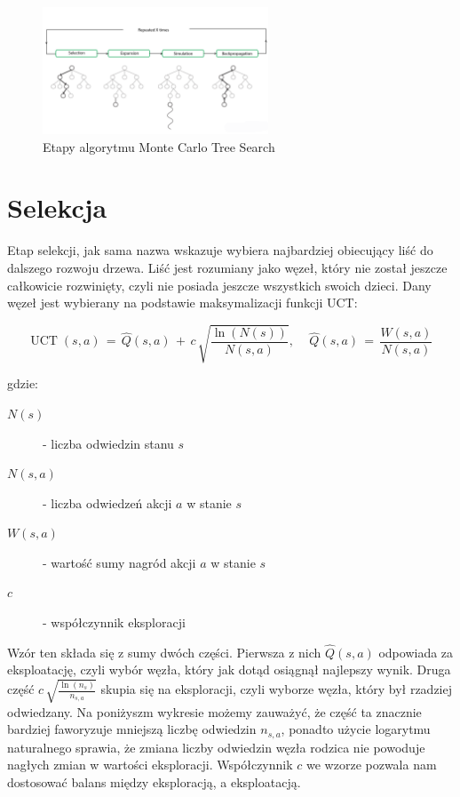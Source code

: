 \begin{figure}[!ht]
\centering
\includegraphics[width=0.6\textwidth]{images/mcts_sections.png}
\caption{Etapy algorytmu Monte Carlo Tree Search}
\end{figure}

\section{Selekcja}
Etap selekcji, jak sama nazwa wskazuje wybiera najbardziej obiecujący liść do dalszego rozwoju drzewa. Liść jest rozumiany jako węzeł, który nie został jeszcze całkowicie rozwinięty, czyli nie posiada jeszcze wszystkich swoich dzieci.
Dany węzeł jest wybierany na podstawie maksymalizacji funkcji UCT:

\begin{equation}
\operatorname{UCT}(s,a) \,=\, \widehat{Q}(s,a) \, + \, c\, \sqrt{\frac{\ln(N(s))}{N(s,a)}},\,
\quad
\widehat{Q}(s,a) \,=\, \dfrac{W(s,a)}{N(s,a)}\,
\end{equation}

\noindent gdzie:
\begin{description}
  \item[$N(s)$] - liczba odwiedzin stanu $s$
  \item[$N(s,a)$] - liczba odwiedzeń akcji $a$ w stanie $s$
  \item[$W(s,a)$] - wartość sumy nagród akcji $a$ w stanie $s$
  \item[$c$] - współczynnik eksploracji
\end{description}

\hspace{1cm}

Wzór ten składa się z sumy dwóch części. Pierwsza z nich $\widehat{Q}(s,a)$ odpowiada za eksploatację, czyli wybór węzła, który jak dotąd osiągnął najlepszy wynik. Druga część $c\, \sqrt{\frac{\ln(n_s)}{n_{s,a}}}$ skupia się na eksploracji, czyli wyborze węzła, który był rzadziej odwiedzany. Na poniżyszm wykresie możemy zauważyć, że część ta znacznie bardziej faworyzuje mniejszą liczbę odwiedzin $n_{s,a}$, ponadto użycie logarytmu naturalnego sprawia, że zmiana liczby odwiedzin węzła rodzica nie powoduje nagłych zmian w wartości eksploracji. Współczynnik $c$ we wzorze pozwala nam dostosować balans między eksploracją, a eksploatacją.

